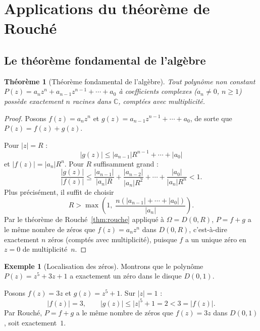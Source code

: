 \documentclass[12pt,a4paper,openany]{book}
\theoremstyle{definition}
\newtheorem{exemple}[definition]{Exemple}
\theoremstyle{plain}
\newtheorem{theoreme}[definition]{Théorème}
\theoremstyle{remark}
\newcommand{\C}{\mathbb{C}}
\newcommand{\abs}[1]{\left|#1\right|}
\begin{document}
\section{Applications du théorème de Rouché}\label{sec:applications-rouche}

\subsection{Le théorème fondamental de l'algèbre}

\begin{theoreme}[Théorème fondamental de l'algèbre]\label{thm:fta-rouche}
Tout polynôme non constant $P(z) = a_n z^n + a_{n-1}z^{n-1} + \cdots + a_0$
à coefficients complexes ($a_n \neq 0$, $n \geq 1$) possède exactement $n$
racines dans $\C$, comptées avec multiplicité.
\end{theoreme}

\begin{proof}
Posons $f(z) = a_n z^n$ et $g(z) = a_{n-1}z^{n-1} + \cdots + a_0$, de sorte
que $P(z) = f(z) + g(z)$.

Pour $\abs{z} = R$ :
\[
  \abs{g(z)} \leq \abs{a_{n-1}} R^{n-1} + \cdots + \abs{a_0}
\]
et $\abs{f(z)} = \abs{a_n} R^n$. Pour $R$ suffisamment grand :
\[
  \frac{\abs{g(z)}}{\abs{f(z)}} \leq \frac{\abs{a_{n-1}}}{\abs{a_n} R}
  + \frac{\abs{a_{n-2}}}{\abs{a_n} R^2} + \cdots + \frac{\abs{a_0}}{\abs{a_n} R^n}
  < 1.
\]
Plus précisément, il suffit de choisir
\[
  R > \max\!\left(1, \; \frac{n(\abs{a_{n-1}} + \cdots + \abs{a_0})}{\abs{a_n}}\right).
\]
Par le théorème de Rouché~\ref{thm:rouche} appliqué à $\Omega = D(0,R)$,
$P = f + g$ a le même nombre de zéros que $f(z) = a_n z^n$ dans $D(0,R)$,
c'est-à-dire exactement $n$ zéros (comptés avec multiplicité), puisque
$f$ a un unique zéro en $z = 0$ de multiplicité~$n$.
\end{proof}

\begin{exemple}[Localisation des zéros]\label{ex:rouche-localisation}
Montrons que le polynôme $P(z) = z^5 + 3z + 1$ a exactement un zéro dans le
disque $D(0,1)$.

Posons $f(z) = 3z$ et $g(z) = z^5 + 1$. Sur $\abs{z} = 1$ :
\[
  \abs{f(z)} = 3, \qquad \abs{g(z)} \leq \abs{z}^5 + 1 = 2 < 3 = \abs{f(z)}.
\]
Par Rouché, $P = f + g$ a le même nombre de zéros que $f(z) = 3z$ dans $D(0,1)$,
soit exactement~$1$.
\end{exemple}
\end{document}
